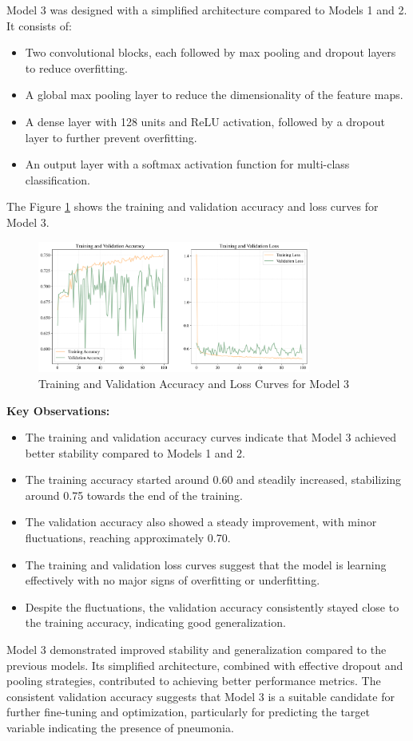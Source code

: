 Model 3 was designed with a simplified architecture compared to Models 1 and 2. It consists of:
\begin{itemize}
    \item Two convolutional blocks, each followed by max pooling and dropout layers to reduce overfitting.
    \item A global max pooling layer to reduce the dimensionality of the feature maps.
    \item A dense layer with 128 units and ReLU activation, followed by a dropout layer to further prevent overfitting.
    \item An output layer with a softmax activation function for multi-class classification.
\end{itemize}
The Figure \ref{fig:chap3 figure3} shows the training and validation accuracy and loss curves for Model 3.

\begin{figure}[H]
    \centering
    \includegraphics[width=0.8\textwidth]{figures/Figure31.png}
    \caption{Training and Validation Accuracy and Loss Curves for Model 3}
    \label{fig:chap3 figure3}
\end{figure}

\textbf{Key Observations:}
\begin{itemize}
    \item The training and validation accuracy curves indicate that Model 3 achieved better stability compared to Models 1 and 2.
    \item The training accuracy started around 0.60 and steadily increased, stabilizing around 0.75 towards the end of the training.
    \item The validation accuracy also showed a steady improvement, with minor fluctuations, reaching approximately 0.70.
    \item The training and validation loss curves suggest that the model is learning effectively with no major signs of overfitting or underfitting.
    \item Despite the fluctuations, the validation accuracy consistently stayed close to the training accuracy, indicating good generalization.
\end{itemize}

Model 3 demonstrated improved stability and generalization compared to the previous models. Its simplified architecture, combined with effective dropout and pooling strategies, contributed to achieving better performance metrics. The consistent validation accuracy suggests that Model 3 is a suitable candidate for further fine-tuning and optimization, particularly for predicting the target variable indicating the presence of pneumonia.